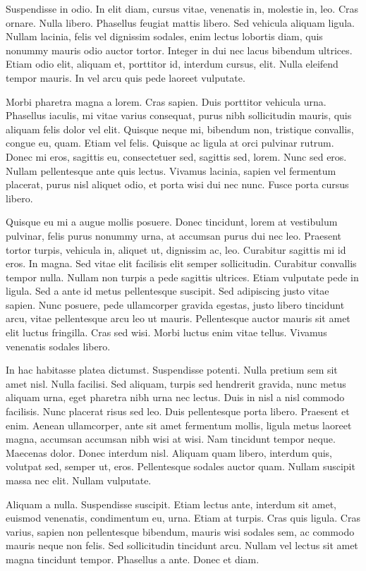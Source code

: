 \documentclass{article}
\begin{document}
Suspendisse in odio. In elit diam, cursus vitae, venenatis in, molestie in,
leo. Cras ornare. Nulla libero. Phasellus feugiat mattis libero. Sed vehicula
aliquam
ligula. Nullam lacinia, felis vel dignissim sodales, enim lectus lobortis diam, quis
nonummy mauris odio auctor tortor. Integer in dui nec lacus bibendum ultrices.
Etiam odio elit, aliquam et, porttitor id, interdum cursus, elit. Nulla
eleifend tempor mauris. In vel arcu quis pede laoreet vulputate.

Morbi pharetra magna a lorem. Cras sapien. Duis porttitor vehicula urna.
Phasellus iaculis, mi vitae varius consequat, purus nibh sollicitudin mauris,
quis aliquam felis dolor vel elit. Quisque neque mi, bibendum non, tristique
convallis, congue eu, quam. Etiam vel felis. Quisque ac ligula at orci pulvinar
rutrum. Donec mi eros, sagittis eu, consectetuer sed, sagittis sed, lorem. Nunc
sed eros. Nullam pellentesque ante quis lectus. Vivamus lacinia, sapien vel
fermentum placerat, purus nisl aliquet odio, et porta wisi dui nec nunc. Fusce
porta cursus libero.

Quisque eu mi a augue mollis posuere. Donec tincidunt, lorem at vestibulum
pulvinar, felis purus nonummy urna, at accumsan purus dui nec leo. Praesent
tortor turpis, vehicula in, aliquet ut, dignissim ac, leo. Curabitur sagittis
mi id eros. In magna. Sed vitae elit facilisis elit semper sollicitudin.
Curabitur convallis tempor nulla. Nullam non turpis a pede sagittis ultrices.
Etiam vulputate pede in ligula. Sed a ante id metus pellentesque suscipit. Sed
adipiscing justo vitae sapien. Nunc posuere, pede ullamcorper gravida egestas,
justo libero tincidunt arcu, vitae pellentesque arcu leo ut mauris.
Pellentesque auctor mauris sit amet elit luctus fringilla. Cras sed wisi. Morbi
luctus enim vitae tellus. Vivamus venenatis sodales libero.

In hac habitasse platea dictumst. Suspendisse potenti. Nulla pretium sem
sit amet nisl. Nulla facilisi. Sed aliquam, turpis sed hendrerit gravida, nunc
metus aliquam urna, eget pharetra nibh urna nec lectus. Duis in nisl a nisl
commodo facilisis. Nunc placerat risus sed leo. Duis pellentesque porta libero.
Praesent et enim. Aenean ullamcorper, ante sit amet fermentum mollis, ligula
metus laoreet magna, accumsan accumsan nibh wisi at wisi. Nam tincidunt tempor
neque. Maecenas dolor. Donec interdum nisl. Aliquam quam libero, interdum quis,
volutpat sed, semper ut, eros. Pellentesque sodales auctor quam. Nullam
suscipit massa nec elit. Nullam vulputate.

Aliquam a nulla. Suspendisse suscipit. Etiam lectus ante, interdum sit amet,
euismod venenatis, condimentum eu, urna. Etiam at turpis. Cras quis ligula.
Cras varius, sapien non pellentesque bibendum, mauris wisi sodales sem, ac
commodo mauris neque non felis. Sed sollicitudin tincidunt arcu. Nullam vel
lectus sit amet magna tincidunt tempor. Phasellus a ante. Donec et diam.
\end{document}
